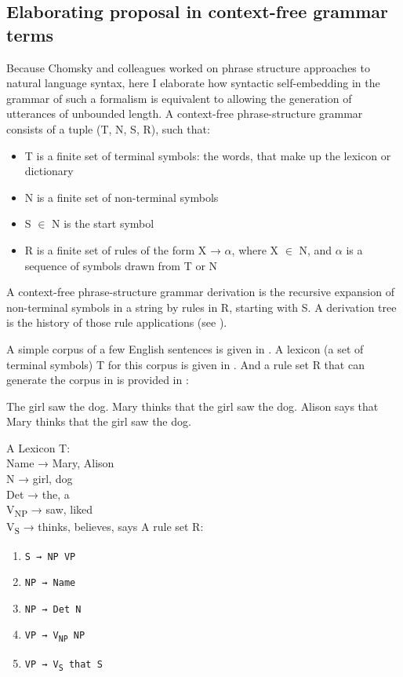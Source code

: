 \documentclass[output=paper]{langscibook}
\begin{document}
\subsection{Elaborating  proposal in context-free grammar terms}

Because Chomsky and colleagues worked on phrase structure approaches to natural language syntax, here I elaborate how syntactic self-embedding in the grammar of such a formalism is equivalent to allowing the generation of utterances of unbounded length. A context-free phrase-structure grammar consists of a tuple (T, N, S, R), such that:

\begin{itemize}
    \item T is a finite set of terminal symbols: the words, that make up the lexicon or dictionary
    \item N is a finite set of non-terminal symbols
    \item S $\in$ N is the start symbol
    \item R is a finite set of rules of the form X → $\alpha$, where X $\in$ N, and $\alpha$ is a sequence of symbols drawn from T or N
\end{itemize}

A context-free phrase-structure grammar derivation is the recursive expansion of non-terminal symbols in a string by rules in R, starting with S. A derivation tree is the history of those rule applications (see \citealt{chomsky1959certain, lewis1998elements, hopcroft2001introduction}).

A simple corpus of a few English sentences is given in . A lexicon (a set of terminal symbols) T for this corpus is given in . And a rule set R that can generate the corpus in  is provided in :

\eal
\label{corpus1}
\ex\label{corpus1a} The girl saw the dog.
\ex\label{corpus1c} Mary thinks that the girl saw the dog.
\ex\label{corpus1d} Alison says that Mary thinks that the girl saw the dog.
\zl

\ea
\label{lexicon1}
A Lexicon T:\smallskip\\
{\ttfamily
Name → Mary, Alison\\
N → girl, dog\\
Det → the, a\\
V\textsubscript{NP} → saw, liked\\
V\textsubscript{S} → thinks, believes, says
}
\z
\pagebreak
\ea
\label{cfg1}
A rule set R:
\begin{multicols}{2}
\begin{enumerate}
\item \texttt{S → NP VP}
\item \texttt{NP → Name}
\item \texttt{NP → Det N}
\item \texttt{VP → V\textsubscript{NP} NP}
\item \texttt{VP → V\textsubscript{S} that S}
\end{enumerate}
\end{multicols}
\z
\end{document}
